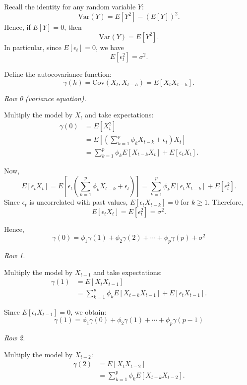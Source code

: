 \documentclass[10pt,a4paper]{article}
\begin{document}
	Recall the identity for any random variable \(Y\):
	\[
	\mathrm{Var}(Y) = E[Y^2] - (E[Y])^2.
	\]
	Hence, if \(E[Y] = 0\), then
	\[
	\mathrm{Var}(Y) = E[Y^2].
	\]
	In particular, since \(E[\epsilon_t] = 0\), we have
	\[
	E[\epsilon_t^2] = \sigma^2.
	\]
	
	Define the autocovariance function:
	\[
	\gamma(h) = \mathrm{Cov}(X_t, X_{t-h}) = E[X_t X_{t-h}].
	\]
	
	\medskip
	
	\textit{Row 0 (variance equation).}
	
	Multiply the model by \(X_t\) and take expectations:
	\begin{align*}
	\gamma(0) &= E[X_t^2] \\
	&= E\left[\left(\sum_{k=1}^p \phi_k X_{t-k} + \epsilon_t\right) X_t\right] \\
	&= \sum_{k=1}^p \phi_k E[X_{t-k} X_t] + E[\epsilon_t X_t].
	\end{align*}
	
	Now,
	\[
	E[\epsilon_t X_t]
	= E\left[\epsilon_t\left(\sum_{k=1}^p \phi_k X_{t-k} + \epsilon_t\right)\right]
	= \sum_{k=1}^p \phi_k E[\epsilon_t X_{t-k}] + E[\epsilon_t^2].
	\]
	Since \(\epsilon_t\) is uncorrelated with past values, \(E[\epsilon_t X_{t-k}] = 0\) for \(k \geq 1\). Therefore,
	\[
	E[\epsilon_t X_t] = E[\epsilon_t^2] = \sigma^2.
	\]
	
	Hence,
	\[
	\gamma(0) = \phi_1 \gamma(1) + \phi_2 \gamma(2) + \cdots + \phi_p \gamma(p) + \sigma^2
	\]
	
	\medskip
	
	\textit{Row 1.}
	
	Multiply the model by \(X_{t-1}\) and take expectations:
	\begin{align*}
	\gamma(1) &= E[X_t X_{t-1}] \\
	&= \sum_{k=1}^p \phi_k E[X_{t-k} X_{t-1}] + E[\epsilon_t X_{t-1}].
	\end{align*}
	
	Since \(E[\epsilon_t X_{t-1}] = 0\), we obtain:
	\[
	\gamma(1) = \phi_1 \gamma(0) + \phi_2 \gamma(1) + \cdots + \phi_p \gamma(p-1)
	\]
	
	\medskip
	
	\textit{Row 2.}
	
	Multiply the model by \(X_{t-2}\):
	\begin{align*}
	\gamma(2) &= E[X_t X_{t-2}] \\
	&= \sum_{k=1}^p \phi_k E[X_{t-k} X_{t-2}].
	\end{align*}
	
\end{document}
